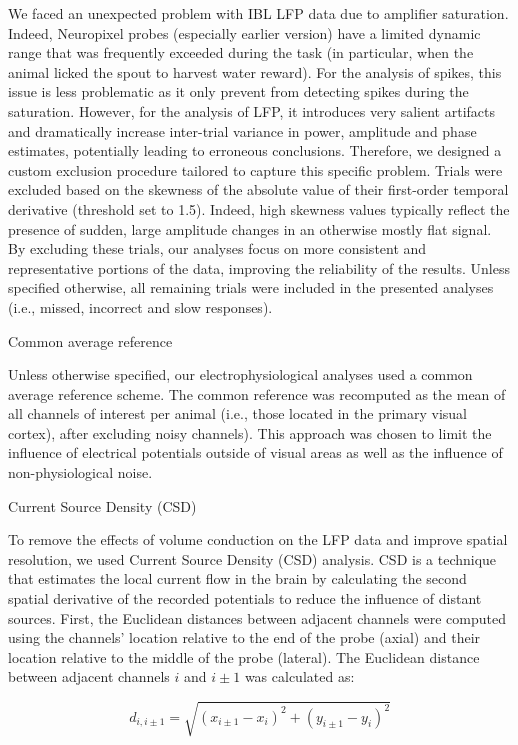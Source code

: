 \documentclass[
  letterpaper,
  DIV=11,
  numbers=noendperiod]{scrartcl}
\begin{document}
We faced an unexpected problem with IBL LFP data due to amplifier
saturation. Indeed, Neuropixel probes (especially earlier version) have
a limited dynamic range that was frequently exceeded during the task (in
particular, when the animal licked the spout to harvest water reward).
For the analysis of spikes, this issue is less problematic as it only
prevent from detecting spikes during the saturation. However, for the
analysis of LFP, it introduces very salient artifacts and dramatically
increase inter-trial variance in power, amplitude and phase estimates,
potentially leading to erroneous conclusions. Therefore, we designed a
custom exclusion procedure tailored to capture this specific problem.
Trials were excluded based on the skewness of the absolute value of
their first-order temporal derivative (threshold set to 1.5). Indeed,
high skewness values typically reflect the presence of sudden, large
amplitude changes in an otherwise mostly flat signal. By excluding these
trials, our analyses focus on more consistent and representative
portions of the data, improving the reliability of the results. Unless
specified otherwise, all remaining trials were included in the presented
analyses (i.e., missed, incorrect and slow responses).

Common average reference

Unless otherwise specified, our electrophysiological analyses used a
common average reference scheme. The common reference was recomputed as
the mean of all channels of interest per animal (i.e., those located in
the primary visual cortex), after excluding noisy channels). This
approach was chosen to limit the influence of electrical potentials
outside of visual areas as well as the influence of non-physiological
noise.

Current Source Density (CSD)

To remove the effects of volume conduction on the LFP data and improve
spatial resolution, we used Current Source Density (CSD) analysis. CSD
is a technique that estimates the local current flow in the brain by
calculating the second spatial derivative of the recorded potentials to
reduce the influence of distant sources. First, the Euclidean distances
between adjacent channels were computed using the channels' location
relative to the end of the probe (axial) and their location relative to
the middle of the probe (lateral). The Euclidean distance between
adjacent channels \(i\) and \(i \pm 1\) was calculated as:

\[
d_{i,i \pm 1} = \sqrt{(x_{i \pm 1} - x_i)^2 + (y_{i \pm 1} - y_i)^2}
\]
\end{document}
